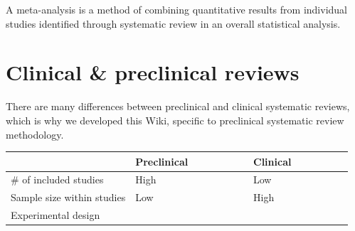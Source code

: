 \documentclass[
]{book}
\begin{document}
A meta-analysis is a method of combining quantitative results from individual studies identified through systematic review in an overall statistical analysis.

\hypertarget{clinical-preclinical-reviews}{%
\section{Clinical \& preclinical reviews}\label{clinical-preclinical-reviews}}

There are many differences between preclinical and clinical systematic reviews, which is why we developed this Wiki, specific to preclinical systematic review methodology.

\begin{longtable}[]{@{}lll@{}}
\toprule
\begin{minipage}[b]{0.46\columnwidth}\raggedright
\strut
\end{minipage} & \begin{minipage}[b]{0.24\columnwidth}\raggedright
Preclinical ~~~~~~~~~\strut
\end{minipage} & \begin{minipage}[b]{0.22\columnwidth}\raggedright
Clinical~~~~~~~~~\strut
\end{minipage}\tabularnewline
\midrule
\endhead
\begin{minipage}[t]{0.46\columnwidth}\raggedright
\# of included studies\strut
\end{minipage} & \begin{minipage}[t]{0.24\columnwidth}\raggedright
High\strut
\end{minipage} & \begin{minipage}[t]{0.22\columnwidth}\raggedright
Low\strut
\end{minipage}\tabularnewline
\begin{minipage}[t]{0.46\columnwidth}\raggedright
Sample size within studies\strut
\end{minipage} & \begin{minipage}[t]{0.24\columnwidth}\raggedright
Low\strut
\end{minipage} & \begin{minipage}[t]{0.22\columnwidth}\raggedright
High\strut
\end{minipage}\tabularnewline
\begin{minipage}[t]{0.46\columnwidth}\raggedright
Experimental design\strut
\end{minipage} & \begin{minipage}[t]{0.24\columnwidth}\raggedright

\end{minipage}
\end{longtable}
\end{document}
